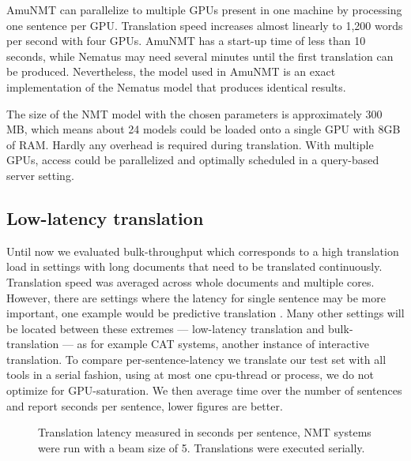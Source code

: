 \documentclass[11pt]{article}
\begin{document}
AmuNMT can parallelize to multiple GPUs present in one machine by processing one sentence per GPU. Translation speed increases almost linearly to 1,200 words per second with four GPUs. 
AmuNMT has a start-up time of less than 10 seconds, while Nematus may need several minutes until the first translation can be produced. Nevertheless, the model used in AmuNMT is an exact implementation of the Nematus model that produces identical results.

The size of the NMT model with the chosen parameters is approximately 300 MB, which means about 24 models could be loaded onto a single GPU with 8GB of RAM. Hardly any overhead is required during translation. With multiple GPUs, access could be parallelized and optimally scheduled in a query-based server setting. 

\subsection{Low-latency translation}

Until now we evaluated bulk-throughput which corresponds to a high translation load in settings with long documents that need to be translated continuously. Translation speed was averaged across whole documents and multiple cores. However, there are settings where the latency for single sentence may be more important, one example would be predictive translation \cite{Knowles}. Many other settings will be located between these extremes --- low-latency translation and bulk-translation --- as for example CAT systems, another instance of interactive translation. 
To compare per-sentence-latency we translate our test set with all tools in a serial fashion, using at most one cpu-thread or process, we do not optimize for GPU-saturation. We then average time over the number of sentences and report seconds per sentence, lower figures are better.

\begin{figure}[t]
\centering
{}
\caption{Translation latency measured in seconds per sentence, NMT systems were run with a beam size of 5. Translations were executed serially.}\label{latency}
\end{figure}
\end{document}
